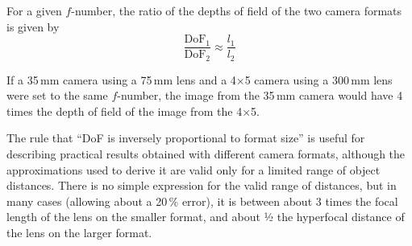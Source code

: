 \documentclass[11pt, oneside]{scrartcl}   	%
\begin{document}
For a given $f$-number, the ratio of the depths of field of the two camera formats is given by
\begin{equation}
   \frac{\mathrm{DoF}_1}{\mathrm{DoF}_2} \approx \frac{l_1}{l_2}
   \label{eq:77}
\end{equation}

If a 35\,mm camera using a 75\,mm lens and a 4×5 camera using a 300\,mm lens were set to the same $f$-number, the image from the 35\,mm camera would have 4 times the depth of field of the image from the 4×5.

The rule that “DoF is inversely proportional to format size” is useful for describing practical results obtained with different camera formats, although the approximations used to derive it are valid only for a limited range of object distances. There is no simple expression for the valid range of distances, but in many cases (allowing about a 20\,\% error), it is between about 3 times the focal length of the lens on the smaller format, and about 1⁄2 the hyperfocal distance of the lens on the larger format.
\end{document}

